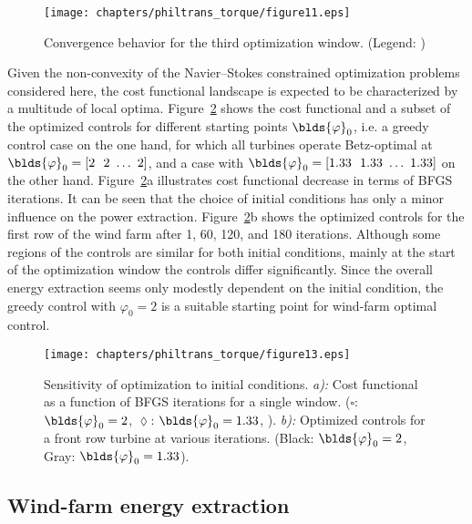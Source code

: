 \begin{figure}
	\centering
	\texttt{[image: chapters/philtrans\_torque/figure11.eps]}
	\caption[Convergence behavior for the third optimization window.]{Convergence behavior for the third optimization window. (Legend: \legendnoref) \label{fig:window_opt}}
\end{figure}
	
Given the non-convexity of the Navier--Stokes constrained optimization problems considered here, the cost functional landscape is expected to be characterized by a multitude of local optima. Figure~\ref{fig:initial_conditions} shows the cost functional and a subset of the optimized controls for different starting points $\blds{\varphi}_0$, i.e. a greedy control case on the one hand, for which all turbines operate Betz-optimal at $\blds{\varphi}_0 = [2 \ \ 2 \ \dots \ 2]$, and a case with $\blds{\varphi}_0 = [1.33 \ \ 1.33 \ \dots \ 1.33]$ on the other hand. Figure~\ref{fig:initial_conditions}a illustrates cost functional decrease in terms of BFGS iterations. It can be seen that the choice of initial conditions has only a minor influence on the power extraction. Figure~\ref{fig:initial_conditions}b shows the optimized controls for the first row of the wind farm after 1, 60, 120, and 180 iterations. Although some regions of the controls are similar for both initial conditions, mainly at the start of the optimization window the controls differ significantly. Since the overall energy extraction seems only modestly dependent on the initial condition, the greedy control with $\varphi_0 = 2$ is a suitable starting point for wind-farm optimal control.

\begin{figure}[ht!]
	\centering
	\texttt{[image: chapters/philtrans\_torque/figure13.eps]}	
	\caption[Sensitivity of optimization to initial conditions.]{Sensitivity of optimization to initial conditions. \emph{a):} Cost functional as a function of BFGS iterations for a single window. ($\square$: $\blds{\varphi}_0 = 2$, $\lozenge$: $\blds{\varphi}_0 = 1.33$, \legendnoref ). \emph{b):} Optimized controls for a front row turbine at various iterations. (Black: $\blds{\varphi}_0 = 2$, Gray: $\blds{\varphi}_0 = 1.33$). \label{fig:initial_conditions}} 
\end{figure}


\subsection{Wind-farm energy extraction}\label{sec:opt_ind_energy}

